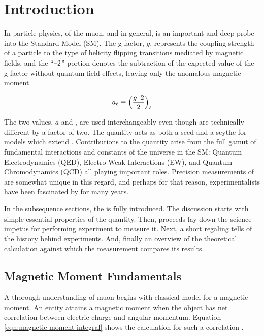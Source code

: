 \chapter {Introduction} \label{ch:intro}
In particle physics, \gmtwo of the muon, and \gmtwo in general, is an important and deep probe into the Standard Model (SM). The g-factor, $g$, represents the coupling strength of a particle to the type of helicity flipping transitions mediated by magnetic fields, and the ``$\hbox{--}2$'' portion denotes the subtraction of the expected value of the g-factor without quantum field effects, leaving only the anomalous magnetic moment.

\begin{equation}
\label{eqn:a-lepton}
a_{\ell} \equiv \Big(\frac{g\hbox{--}2}{2} \Big)_\ell
\end{equation}

\noindent
The two values, $a$ and \gmtwo, are used interchangeably even though are technically different by a factor of two.  The quantity acts as both a seed and a scythe for models which extend \tsm.  Contributions to the quantity arise from the full gamut of fundamental interactions and constants of the universe in the SM: Quantum Electrodynamics (QED), Electro-Weak Interactions (EW), and Quantum Chromodynamics (QCD) all playing important roles.  Precision measurements of \gmtwo are somewhat unique in this regard, and perhaps for that reason, experimentalists have been fascinated by \gmtwo for many years.

In the subsequence sections, the \mugmtwo is fully introduced.  The discussion starts with simple essential properties of the quantity.  Then, proceeds lay down the science impetus for performing experiment to measure it.  Next, a short regaling tells of the history behind \gmtwo experiments.  And, finally an overview of the theoretical calculation against which the measurement compares its results.

\section{Magnetic Moment Fundamentals} \label{sec:mag-moment-fundamentals}

A thorough understanding of muon \gmtwo begins with classical model for a magnetic moment.  An entity attains a magnetic moment when the object has net correlation between electric charge and angular momentum.  Equation \ref{eqn:magnetic-moment-integral} shows the calculation for such a correlation .

